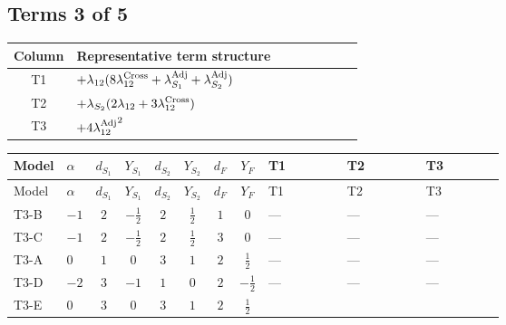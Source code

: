 \documentclass[8pt]{article}
\begin{document}
\begin{landscape}
\subsection*{Terms 3 of 5}
\begin{center}
\begin{tabular}{@{}c >{\raggedright\arraybackslash}p{0.82\linewidth}@{}}
\toprule
Column & Representative term structure \\
\midrule
T1 & \(\displaystyle +{\lambda_{12}} (8 {\lambda_{12}^{\rm Cross}}+{\lambda_{S_1}^{\rm Adj}}+{\lambda_{S_2}^{\rm Adj}})\) \\
\midrule
T2 & \(\displaystyle +{\lambda_{S_2}} (2 {\lambda_{12}}+3 {\lambda_{12}^{\rm Cross}})\) \\
\midrule
T3 & \(\displaystyle +4 {\lambda_{12}^{\rm Adj}}^2\) \\
\midrule
\bottomrule
\end{tabular}
\end{center}
\smallskip
\tiny
\begin{longtable}{@{}llcccccc >{\raggedright\arraybackslash}p{0.21\linewidth} >{\raggedright\arraybackslash}p{0.21\linewidth} >{\raggedright\arraybackslash}p{0.21\linewidth}@{}}
\toprule
Model & $\alpha$ & $d_{S_1}$ & $Y_{S_1}$ & $d_{S_2}$ & $Y_{S_2}$ & $d_F$ & $Y_F$ & T1 & T2 & T3 \\
\midrule
\endfirsthead
\toprule
Model & $\alpha$ & $d_{S_1}$ & $Y_{S_1}$ & $d_{S_2}$ & $Y_{S_2}$ & $d_F$ & $Y_F$ & T1 & T2 & T3 \\
\midrule
\endhead
T3-B & $-1$ & $2$ & $-\frac{1}{2}$ & $2$ & $\frac{1}{2}$ & $1$ & $0$ & --- & --- & --- \\
\midrule
T3-C & $-1$ & $2$ & $-\frac{1}{2}$ & $2$ & $\frac{1}{2}$ & $3$ & $0$ & --- & --- & --- \\
\midrule
T3-A & $0$ & $1$ & $0$ & $3$ & $1$ & $2$ & $\frac{1}{2}$ & --- & --- & --- \\
\midrule
T3-D & $-2$ & $3$ & $-1$ & $1$ & $0$ & $2$ & $-\frac{1}{2}$ & --- & --- & --- \\
\midrule
T3-E & $0$ & $3$ & $0$ & $3$ & $1$ & $2$ & $\frac{1}{2}$ & \scriptsize\adjustbox{max width=\linewidth}{$\begin{gathered} +{\lambda_{12}} (8 {\lambda_{12}^{\rm Cross}}+{\lambda_{S_1}^{\rm Adj}}+{\lambda_{S_2}^{\rm Adj}})\end{gathered}$} & \scriptsize\adjustbox{max width=\linewidth}{$\begin{gathered} +{\lambda_{S_2}} (2 {\lambda_{12}}+3 {\lambda_{12}^{\rm Cross}})\end{gathered}$} & \scriptsize\adjustbox{max width=\linewidth}{$\begin{gathered} +4 {\lambda_{12}^{\rm Adj}}^2\end{gathered}$} \\
\midrule
\bottomrule
\end{longtable}
\clearpage

\end{landscape}
\end{document}
